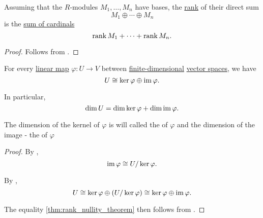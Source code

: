 \begin{proposition}\label{thm:rank_of_direct_sum}
  Assuming that the \( R \)-modules \( M_1, \ldots, M_n \) have bases, the \hyperref[thm:commutative_module_rank]{rank} of their direct sum
  \begin{equation*}
    M_1 \oplus \cdots \oplus M_n
  \end{equation*}
  is the \hyperref[def:cardinal_arithmetic/addition]{sum of cardinals}
  \begin{equation*}
    \operatorname{rank} M_1 + \cdots + \operatorname{rank} M_n.
  \end{equation*}
\end{proposition}
\begin{proof}
  Follows from .
\end{proof}

\begin{theorem}\label{thm:rank_nullity_theorem}
  For every \hyperref[def:semimodule/homomorphism]{linear map} \( \varphi: U \to V \) between \hyperref[thm:vector_space_dimension]{finite-dimensional} \hyperref[def:vector_space]{vector spaces}, we have
  \begin{equation}\label{eq:thm:rank_nullity_theorem}
    U \cong \ker \varphi \oplus \operatorname{im} \varphi.
  \end{equation}

  In particular,
  \begin{equation}\label{eq:thm:rank_nullity_theorem/dim}
    \dim U = \dim \ker \varphi + \dim \operatorname{im} \varphi.
  \end{equation}

  The dimension of the kernel of \( \varphi \) is will called the  of \( \varphi \) and the dimension of the image - the  of \( \varphi \)
\end{theorem}
\begin{proof}
  By ,
  \begin{equation*}
    \operatorname{im} \varphi \cong U / \ker \varphi.
  \end{equation*}

  By ,
  \begin{equation*}
    U \cong \ker \varphi \oplus (U / \ker \varphi) \cong \ker \varphi \oplus \operatorname{im} \varphi.
  \end{equation*}

  The equality \eqref{thm:rank_nullity_theorem} then follows from .
\end{proof}
